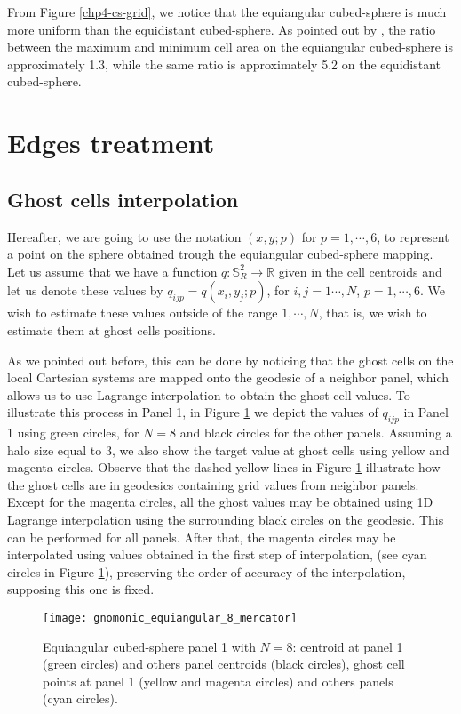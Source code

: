 From Figure \ref{chp4-cs-grid}, we notice that the equiangular cubed-sphere is much more uniform
than the equidistant cubed-sphere. As pointed out by \citet{rancic:1996}, the ratio
between the maximum and minimum cell area on the equiangular cubed-sphere is approximately 1.3,
while the same ratio is approximately 5.2 on the equidistant cubed-sphere. 

\section{Edges treatment}
\label{cs-halodata}
\subsection{Ghost cells interpolation}
\label{cs-interp}
Hereafter, we are going to use the notation $(x,y;p)$ for $p=1,\cdots, 6$, to represent a
point on the sphere obtained trough the equiangular cubed-sphere mapping.
Let us assume that we have a function $q: \mathbb{S}^2_R \to \mathbb{R}$
given in the cell centroids and let us denote these values by $q_{ijp} = q(x_i,y_j;p)$,
for $i,j=1\cdots, N$, $p=1,\cdots, 6$. We wish to estimate these values outside of the range
$1, \cdots, N$, that is, we wish to estimate them at ghost cells positions.

As we pointed out before, this can be done by noticing that the ghost cells on the local
Cartesian systems are mapped onto the geodesic of a neighbor panel, which allows us to use Lagrange interpolation 
to obtain the ghost cell values.
To illustrate this process in Panel 1, in Figure \ref{chp4-cs-halodata} we depict the values of $q_{ijp}$ in Panel 1 using green circles, for $N=8$ 
and black circles for the other panels. Assuming a halo size equal to 3, we also show the target value at ghost cells 
using yellow and magenta circles. Observe that the dashed yellow lines in Figure \ref{chp4-cs-halodata} illustrate
how the ghost cells are in geodesics containing grid values from neighbor panels. Except for the magenta circles,
all the ghost values may be obtained using 1D Lagrange interpolation using the surrounding black circles on the geodesic.
This can be performed for all panels. After that, the magenta circles may be interpolated using values obtained in the first step of interpolation,
(see cyan circles in Figure \ref{chp4-cs-halodata}), preserving the order of accuracy of the interpolation, supposing this one is fixed. 
\begin{figure}[!htb]
	\centering
	\texttt{[image: gnomonic\_equiangular\_8\_mercator]}
	\caption{Equiangular cubed-sphere panel 1 with $N=8$: 
	centroid at panel 1 (green circles) and others panel centroids (black circles), 
	ghost cell points at panel 1 (yellow and magenta circles) and others panels (cyan circles).}
	\label{chp4-cs-halodata}
\end{figure}

